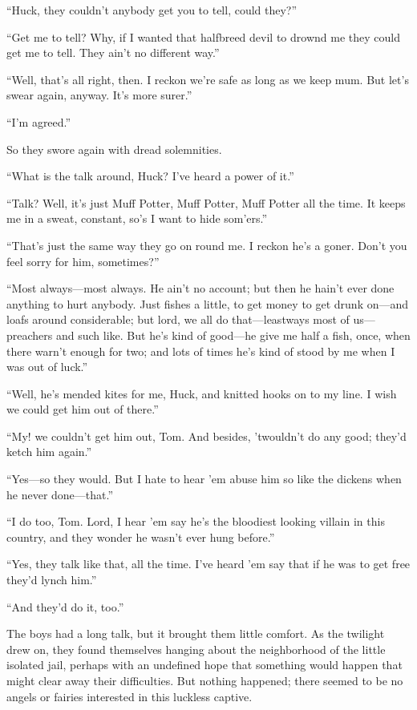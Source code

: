 \documentclass{book}
\begin{document}
“Huck, they couldn’t anybody get you to tell, could they?”

“Get me to tell? Why, if I wanted that halfbreed devil to drownd me they could get me to tell. They ain’t no different way.”

“Well, that’s all right, then. I reckon we’re safe as long as we keep mum. But let’s swear again, anyway. It’s more surer.”

“I’m agreed.”

So they swore again with dread solemnities.

“What is the talk around, Huck? I’ve heard a power of it.”

“Talk? Well, it’s just Muff Potter, Muff Potter, Muff Potter all the time. It keeps me in a sweat, constant, so’s I want to hide som’ers.”

“That’s just the same way they go on round me. I reckon he’s a goner. Don’t you feel sorry for him, sometimes?”

“Most always—most always. He ain’t no account; but then he hain’t ever done anything to hurt anybody. Just fishes a little, to get money to get drunk on—and loafs around considerable; but lord, we all do that—leastways most of us—preachers and such like. But he’s kind of good—he give me half a fish, once, when there warn’t enough for two; and lots of times he’s kind of stood by me when I was out of luck.”

“Well, he’s mended kites for me, Huck, and knitted hooks on to my line. I wish we could get him out of there.”

“My! we couldn’t get him out, Tom. And besides, ’twouldn’t do any good; they’d ketch him again.”

“Yes—so they would. But I hate to hear ’em abuse him so like the dickens when he never done—that.”

“I do too, Tom. Lord, I hear ’em say he’s the bloodiest looking villain in this country, and they wonder he wasn’t ever hung before.”

“Yes, they talk like that, all the time. I’ve heard ’em say that if he was to get free they’d lynch him.”

“And they’d do it, too.”

The boys had a long talk, but it brought them little comfort. As the twilight drew on, they found themselves hanging about the neighborhood of the little isolated jail, perhaps with an undefined hope that something would happen that might clear away their difficulties. But nothing happened; there seemed to be no angels or fairies interested in this luckless captive.
\end{document}
